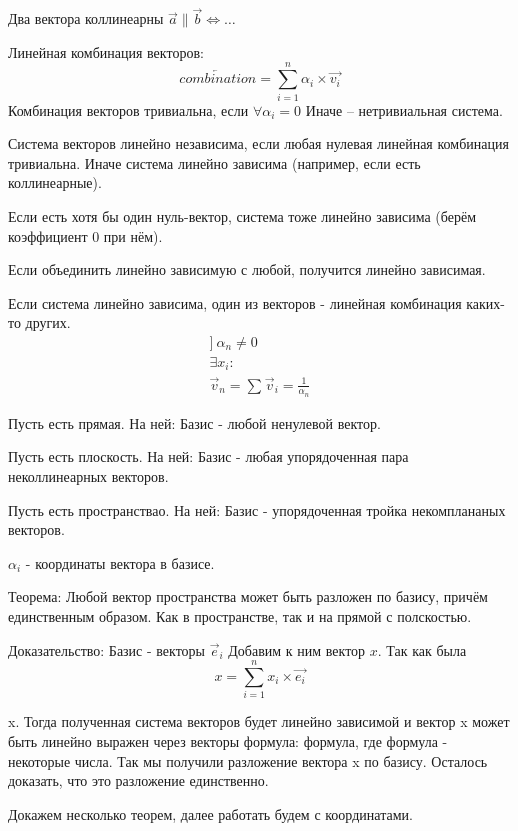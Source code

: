 \documentclass[12pt, a4paper]{article}
\begin{document}
    Два вектора коллинеарны $\vec{a} \parallel \vec{b} \Longleftrightarrow \ldots$

    Линейная комбинация векторов:
    \begin{equation}
        \overleftarrow{combination} = \sum_{i = 1}^{n} {\alpha_i \times \vec{v_i}}
    \end{equation}
    Комбинация векторов тривиальна, если $\forall \alpha_i = 0$
    Иначе -- нетривиальная система.

    Система векторов линейно независима, если любая нулевая линейная комбинация тривиальна.
    Иначе система линейно зависима (например, если есть коллинеарные).

    Если есть хотя бы один нуль-вектор, система тоже линейно зависима (берём коэффициент 0 при нём). 

    Если объединить линейно зависимую с любой, получится линейно зависимая.

    Если система линейно зависима, один из векторов - линейная комбинация каких-то других.
    \begin{gather}
        ]~ \alpha_n \neq 0 \\
        \exists x_i:  \\
        \vec{v}_n = \sum_{}^{} \vec{v}_i = \frac{1}{\alpha_n}
    \end{gather}

    Пусть есть прямая. На ней:
    Базис - любой ненулевой вектор.

    Пусть есть плоскость. На ней:
    Базис - любая упорядоченная пара неколлинеарных векторов.

    Пусть есть пространствао. На ней:
    Базис - упорядоченная тройка некомплананых векторов.

    $\alpha_i$ - координаты вектора в базисе.

    Теорема: 
    Любой вектор пространства может быть разложен по базису, причём единственным образом. 
    Как в пространстве, так и на прямой с полскостью.

    Доказательство:
    Базис - векторы $\vec{e}_i$
    Добавим к ним вектор $x$. Так как была 
    \[
        x = \sum_{i = 1}^{n} x_i \times \vec{e_i}
    \]

    x. Тогда полученная система векторов будет линейно зависимой и вектор x может быть линейно выражен через векторы формула: формула, где формула - некоторые числа. Так мы получили разложение вектора x по базису. Осталось доказать, что это разложение единственно. 

    Докажем несколько теорем, далее работать будем с координатами.
\end{document}
